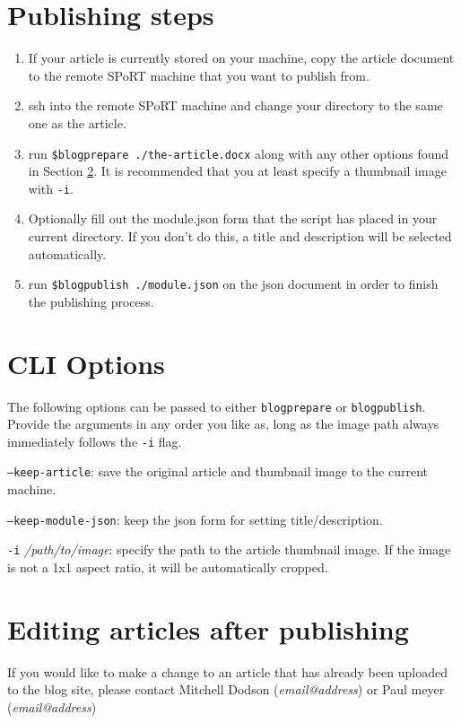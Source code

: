 \documentclass[12pt]{article}
\begin{document}
\begin{multicols}{2}
\vfill\null
\columnbreak

\section{Publishing steps}
\begin{enumerate}
  \item{If your article is currently stored on your machine, copy the article document to the remote SPoRT machine that you want to publish from.}
  \item{ssh into the remote SPoRT machine and change your directory to the same one as the article.}
  \item{run \texttt{\$blogprepare ./the-article.docx} along with any other options found in Section \ref{cli}. It is recommended that you at least specify a thumbnail image with \texttt{-i}.}
  \item{Optionally fill out the module.json form that the script has placed in your current directory. If you don't do this, a title and description will be selected automatically.}
  \item{run \texttt{\$blogpublish ./module.json} on the json document in order to finish the publishing process.}
\end{enumerate}

\section{CLI Options}
\label{cli}

The following options can be passed to either \texttt{blogprepare} or \texttt{blogpublish}. Provide the arguments in any order you like as, long as the image path always immediately follows the \texttt{-i} flag.

\noindent
\texttt{--keep-article}: save the original article and thumbnail image to the current machine.

\noindent
\texttt{--keep-module-json}: keep the json form for setting title/description.

\noindent
\texttt{-i} \textit{/path/to/image}: specify the path to the article thumbnail image. If the image is not a 1x1 aspect ratio, it will be automatically cropped.

\section{Editing articles after publishing}

If you would like to make a change to an article that has already been uploaded to the blog site, please contact Mitchell Dodson (\textit{email@address}) or Paul meyer (\textit{email@address})

\end{multicols}
\printbibliography
\end{document}
